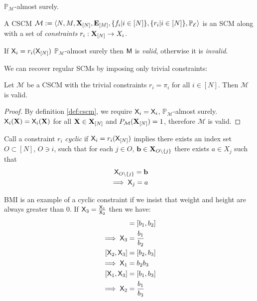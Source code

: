 $\mathbb{P}_{\mathcal{M}}$-almost surely.

\begin{definition}\label{def:cscm}
	A CSCM $\mathcal{M}:= \langle N,M,\mathbf{X}_{[N]},\mathbf{E}_{[M]},\{f_i|i\in[N]\},\{r_i|i\in [N]\},\mathbb{P}_{\mathcal{E}}\rangle$ is an SCM along with a set of \emph{constraints} $r_i:\mathbf{X}_{[N]}\to X_i$. 

	If $\mathsf{X}_i=r_i(\mathsf{X}_{[N]})$ $\mathbb{P}_{\mathcal{M}}$-almost surely then $\mathsf{M}$ is \emph{valid}, otherwise it is \emph{invalid}.
\end{definition}

We can recover regular SCMs by imposing only trivial constraints:

\begin{lemma}
	Let $\mathcal{M}$ be a CSCM with the trivial constraints $r_i=\pi_i$ for all $i\in[N]$. Then $\mathcal{M}$ is valid.
\end{lemma}

\begin{proof}
	By definition \ref{def:cscm}, we require $\mathsf{X}_i = \mathsf{X}_i$, $\mathbb{P}_{\mathcal{M}}$-almost surely. $\mathsf{X}_i(\mathbf{X}) = \mathsf{X}_i(\mathbf{X})$ for all $\mathbf{X}\in\mathbf{X}_{[N]}$ and $P_\mathcal{M}(\mathbf{X}_{[N]})=1$, therefore $\mathcal{M}$ is valid.
\end{proof}

Call a constraint $r_i$ \emph{cyclic} if $\mathsf{X}_i = r_i(\mathsf{X}_{[N]})$ implies there exists an index set $O\subset[N]$, $O\ni i$, such that for each $j\in O$, $\mathbf{b}\in \mathbf{X}_{O\setminus\{j\}}$ there exists $a\in X_j$ such that
\begin{align}
	\mathsf{X}_{O\setminus \{j\}} = \mathbf{b}\\
	\implies \mathsf{X}_j = a
\end{align}

BMI is an example of a cyclic constraint if we insist that weight and height are always greater than 0. If $\mathsf{X}_3 = \frac{\mathsf{X}_1}{\mathsf{X}_2}$ then we have:
\begin{align}
	[\RV{X}_1,\RV{X}_2] &= [b_1,b_2]\\
	\implies \RV{X}_3 &= \frac{b_1}{b_2}\\
	[\RV{X}_2,\RV{X}_3] &= [b_2,b_3]\\
	\implies \RV{X}_1 &= b_2 b_3\\
	[\RV{X}_1,\RV{X}_3] &= [b_1,b_3]\\
	\implies \RV{X}_2 &= \frac{b_1}{b_3}
\end{align}

